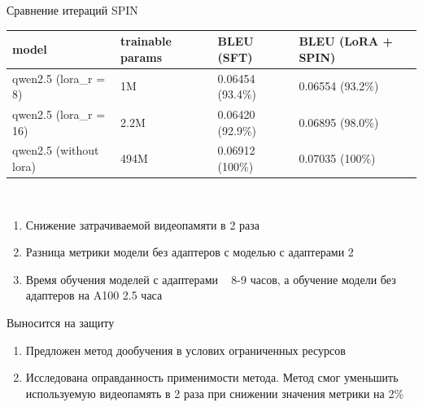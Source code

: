 \documentclass{beamer}
\begin{document}
\begin{frame}{Сравнение итераций SPIN}

\begingroup
    \fontsize{7pt}{12pt}\selectfont
   \begin{tabular}{l|l|l|l|}
        model                  & trainable params & BLEU (SFT)       & BLEU (LoRA + SPIN) \\ \hline
        qwen2.5 (lora\_r = 8)  & 1M               & 0.06454 (93.4\%) & 0.06554 (93.2\%)   \\ \hline
        qwen2.5 (lora\_r = 16) & 2.2M             & 0.06420 (92.9\%) & 0.06895 (98.0\%)   \\ \hline
        qwen2.5 (without lora) & 494M             & 0.06912 (100\%)  & 0.07035 (100\%)    \\ \hline
    \end{tabular}
    \begin{center}
        \tiny {} \\ 
    \end{center}
\endgroup

\bigskip

\begin{enumerate}
  \item Снижение затрачиваемой видеопамяти в 2 раза

  \item Разница метрики модели без адаптеров с моделью с адаптерами 2%

  \item Время обучения моделей с адаптерами ~ 8-9 часов, а обучение модели без адаптеров на A100 2.5 часа
\end{enumerate}
\end{frame}
\begin{frame}{Выносится на защиту}
  \begin{enumerate}
      \item Предложен метод дообучения в услових ограниченных ресурсов
      \item Исследована оправданность применимости метода. Метод смог уменьшить используемую видеопамять в 2 раза при снижении значения метрики на 2\%
  \end{enumerate}
\end{frame}
\end{document}
